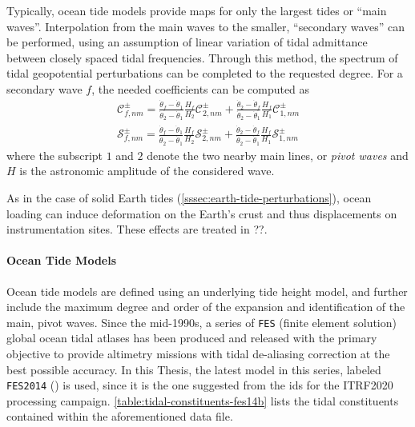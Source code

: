 Typically, ocean tide models provide maps for only the largest tides or ``main waves''. 
Interpolation from the main waves to the smaller, ``secondary waves'' can be performed, 
using an assumption of linear variation of tidal admittance between closely spaced 
tidal frequencies. Through this method, the spectrum of tidal geopotential perturbations 
can be completed to the requested degree. For a secondary wave $f$, the needed 
coefficients can be computed as
\begin{equation}\label{eq:iers10616}
  \begin{aligned}
    \mathcal{C}_{f,nm}^{\pm} = \frac{\dot{\theta}_f - \dot{\theta}_1}{\dot{\theta}_2 - 
        \dot{\theta}_1} \frac{H_f}{H_2} \mathcal{C}_{2,nm}^{\pm} 
        + \frac{\dot{\theta}_2 - \dot{\theta}_f}{\dot{\theta}_2 - \dot{\theta}_1}
        \frac{H_f}{H_1} \mathcal{C}_{1,nm}^{\pm} \\
    \mathcal{S}_{f,nm}^{\pm} = \frac{\dot{\theta}_f - \dot{\theta}_1}{\dot{\theta}_2 - \dot{\theta}_1} 
      \frac{H_f}{H_2} \mathcal{S}_{2,nm}^{\pm} 
      + \frac{\dot{\theta}_2 - \dot{\theta}_f}{\dot{\theta}_2 - \dot{\theta}_1} 
      \frac{H_f}{H_1} \mathcal{S}_{1,nm}^{\pm}
  \end{aligned}
\end{equation}
where the subscript $1$ and $2$ denote the two nearby main lines, or \emph{pivot waves} 
and $H$ is the astronomic amplitude of the considered wave.

As in the case of solid Earth tides (\autoref{sssec:earth-tide-perturbations}), 
ocean loading can induce deformation on the Earth's crust and thus displacements 
on instrumentation sites. These effects are treated in ??.

\paragraph{Ocean Tide Models}\label{par:ocean-tide-models}

Ocean tide models are defined using an underlying tide height model, and further 
include the  maximum degree and order of the expansion and identification of the 
main, pivot waves. Since the mid-1990s, a series of \texttt{FES} (finite element 
solution) global ocean tidal atlases has been produced and released with the primary 
objective to provide altimetry missions with tidal de-aliasing correction at the 
best possible accuracy. In this Thesis, the latest model in this series, labeled 
\texttt{FES2014} (\cite{Lyard2021}) is used, since it is the one suggested 
from the \gls{ids} for the ITRF2020 processing campaign. \autoref{table:tidal-constituents-fes14b} 
lists the tidal constituents contained within the aforementioned data file.

